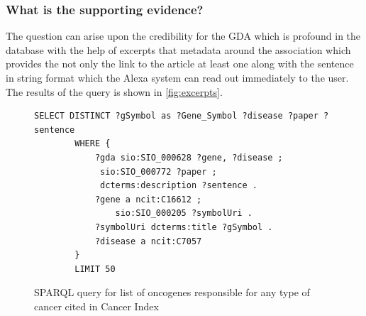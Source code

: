 \documentclass[10pt,journal,compsoc]{IEEEtran}
\begin{document}


\subsubsection{What is the supporting evidence?}
The question can arise upon the credibility for the GDA which is profound in the database with the help of excerpts that metadata around the association which provides the not only the link to the article at least one along with the sentence in string format which the Alexa system can read out immediately to the user. The results of the query is shown in \cref{fig:excerpts}.

\begin{figure}
\scriptsize{
    \begin{lstlisting}[frame=bt,numbers=none,language=SPARQL,linewidth=\linewidth,morekeywords={FILTER,AS,GROUP,BY,VALUES,PREFIX}]
        SELECT DISTINCT ?gSymbol as ?Gene_Symbol ?disease ?paper ?sentence
        WHERE {
            ?gda sio:SIO_000628 ?gene, ?disease ;
             sio:SIO_000772 ?paper ;
             dcterms:description ?sentence .
            ?gene a ncit:C16612 ;
                sio:SIO_000205 ?symbolUri .
            ?symbolUri dcterms:title ?gSymbol .
            ?disease a ncit:C7057
        }
        LIMIT 50
\end{lstlisting}}
    \caption{SPARQL query for list of oncogenes responsible for any type of cancer cited in Cancer Index} 
    \label{fig:sparql_query_1}
\end{figure}
\end{document}
